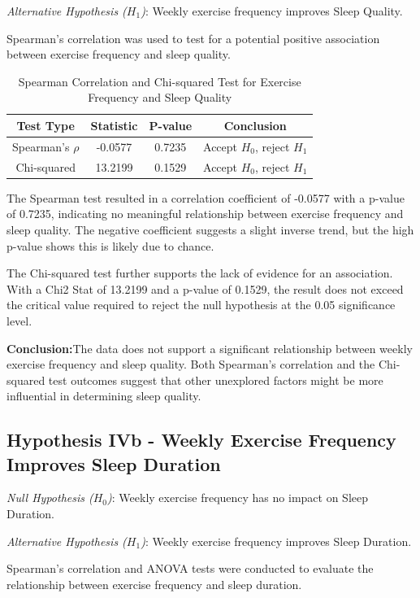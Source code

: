 \documentclass[conference]{IEEEtran}
\begin{document}
\textit{Alternative Hypothesis (\(H_1\))}: Weekly exercise frequency improves Sleep Quality.

Spearman's correlation was used to test for a potential positive association between exercise frequency and sleep quality.

\begin{table}[ht]
    \centering
    \caption{Spearman Correlation and Chi-squared Test for Exercise Frequency and Sleep Quality}
    \label{tab:hypothesis4a}
    \begin{tabular}{|c|c|c|c|}
    \hline
    \textbf{Test Type} & \textbf{Statistic} & \textbf{P-value} & \textbf{Conclusion} \\
    \hline
    Spearman's \(\rho\) & -0.0577 & 0.7235 & Accept \(H_0\), reject \(H_1\) \\
    \hline
    Chi-squared & 13.2199 & 0.1529 & Accept \(H_0\), reject \(H_1\) \\
    \hline
    \end{tabular}
    \end{table}

The Spearman test resulted in a correlation coefficient of -0.0577 with a p-value of 0.7235, indicating no meaningful relationship between exercise frequency and sleep quality. The negative coefficient suggests a slight inverse trend, but the high p-value shows this is likely due to chance.

The Chi-squared test further supports the lack of evidence for an association. With a Chi2 Stat of 13.2199 and a p-value of 0.1529, the result does not exceed the critical value required to reject the null hypothesis at the 0.05 significance level.

\textbf{Conclusion:}The data does not support a significant relationship between weekly exercise frequency and sleep quality. Both Spearman's correlation and the Chi-squared test outcomes suggest that other unexplored factors might be more influential in determining sleep quality.

\subsection*{Hypothesis IVb - Weekly Exercise Frequency Improves Sleep Duration}
\textit{Null Hypothesis (\(H_0\))}: Weekly exercise frequency has no impact on Sleep Duration.

\textit{Alternative Hypothesis (\(H_1\))}: Weekly exercise frequency improves Sleep Duration.

Spearman's correlation and ANOVA tests were conducted to evaluate the relationship between exercise frequency and sleep duration.
\end{document}
